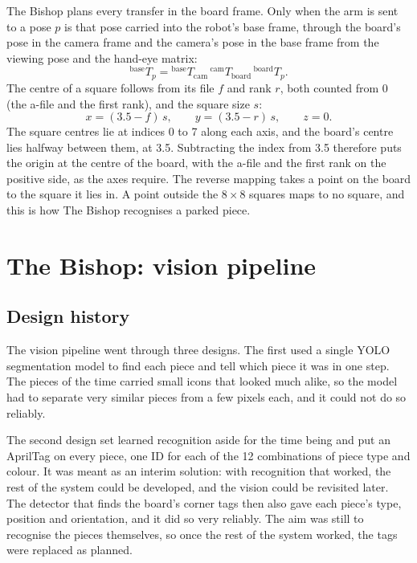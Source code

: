 The Bishop plans every transfer in the board frame.
Only when the arm is sent to a pose $p$ is that pose carried into the robot's base frame, through the board's pose in the camera frame and the camera's pose in the base frame from the viewing pose and the hand-eye matrix:
\begin{equation}
  {}^{\mathrm{base}}T_{p}
  = {}^{\mathrm{base}}T_{\mathrm{cam}} \,
    {}^{\mathrm{cam}}T_{\mathrm{board}} \,
    {}^{\mathrm{board}}T_{p}.
\end{equation}
The centre of a square follows from its file $f$ and rank $r$, both counted from 0 (the a-file and the first rank), and the square size $s$:
\begin{equation}
  x = (3.5 - f)\, s, \qquad y = (3.5 - r)\, s, \qquad z = 0.
\end{equation}
The square centres lie at indices 0 to 7 along each axis, and the board's centre lies halfway between them, at 3.5.
Subtracting the index from 3.5 therefore puts the origin at the centre of the board, with the a-file and the first rank on the positive side, as the axes require.
The reverse mapping takes a point on the board to the square it lies in.
A point outside the $8 \times 8$ squares maps to no square, and this is how The Bishop recognises a parked piece.

\section{The Bishop: vision pipeline}
\label{sec:bishop-vision}

\subsection{Design history}
\label{subsec:design-history}

The vision pipeline went through three designs.
The first used a single \ac{YOLO} segmentation model to find each piece and tell which piece it was in one step.
The pieces of the time carried small icons that looked much alike, so the model had to separate very similar pieces from a few pixels each, and it could not do so reliably.

The second design set learned recognition aside for the time being and put an AprilTag on every piece, one ID for each of the 12 combinations of piece type and colour.
It was meant as an interim solution: with recognition that worked, the rest of the system could be developed, and the vision could be revisited later.
The detector that finds the board's corner tags then also gave each piece's type, position and orientation, and it did so very reliably.
The aim was still to recognise the pieces themselves, so once the rest of the system worked, the tags were replaced as planned.

